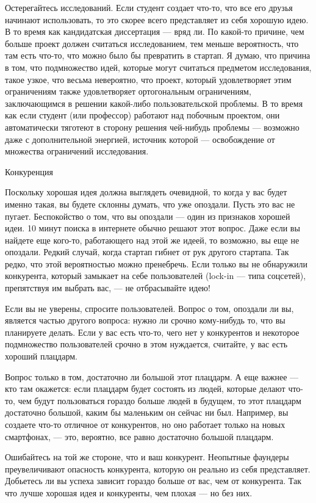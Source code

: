 \documentclass[ebook,12pt,oneside,openany]{memoir}
\begin{document}
Остерегайтесь исследований. Если студент создает что-то, что все его
друзья начинают использовать, то это скорее всего представляет из себя
хорошую идею. В то время как кандидатская диссертация — вряд ли. По
какой-то причине, чем больше проект должен считаться исследованием,
тем меньше вероятность, что там есть что-то, что можно было бы
превратить в стартап. Я думаю, что причина в том, что подмножество
идей, которые могут считаться предметом исследования, такое узкое, что
весьма невероятно, что проект, который удовлетворяет этим ограничениям
также удовлетворяет ортогональным ограничениям, заключающимся в
решении какой-либо пользовательской проблемы. В то время как если
студент (или профессор) работают над побочным проектом, они
автоматически тяготеют в сторону решения чей-нибудь проблемы —
возможно даже с дополнительной энергией, источник которой —
освобождение от множества ограничений исследования.

Конкуренция

Поскольку хорошая идея должна выглядеть очевидной, то когда у вас
будет именно такая, вы будете склонны думать, что уже опоздали. Пусть
это вас не пугает. Беспокойство о том, что вы опоздали — один из
признаков хорошей идеи. 10 минут поиска в интернете обычно решают этот
вопрос. Даже если вы найдете еще кого-то, работающего над этой же
идеей, то возможно, вы еще не опоздали. Редкий случай, когда стартап
гибнет от рук другого стартапа. Так редко, что этой вероятностью можно
пренебречь. Если только вы не обнаружили конкурента, который замыкает
на себе пользователей (lock-in — типа соцсетей), препятствуя им
выбрать вас, — не отбрасывайте идею!

Если вы не уверены, спросите пользователей. Вопрос о том, опоздали ли
вы, является частью другого вопроса: нужно ли срочно кому-нибудь то,
что вы планируете делать. Если у вас есть что-то, чего нет у
конкурентов и некоторое подмножество пользователей срочно в этом
нуждается, считайте, у вас есть хороший плацдарм.

Вопрос только в том, достаточно ли большой этот плацдарм. А еще важнее
— кто там окажется: если плацдарм будет состоять из людей, которые
делают что-то, чем будут пользоваться гораздо больше людей в будущем,
то этот плацдарм достаточно большой, каким бы маленьким он сейчас ни
был. Например, вы создаете что-то отличное от конкурентов, но оно
работает только на новых смартфонах, — это, вероятно, все равно
достаточно большой плацдарм.

Ошибайтесь на той же стороне, что и ваш конкурент. Неопытные фаундеры
преувеличивают опасность конкурента, которую он реально из себя
представляет. Добьетесь ли вы успеха зависит гораздо больше от вас,
чем от конкурента. Так что лучше хорошая идея и конкуренты, чем плохая
— но без них.
\end{document}
